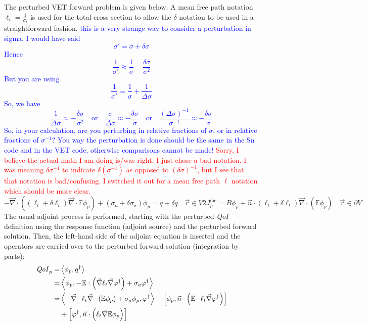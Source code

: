 \documentclass[12pt]{report}
\newcommand{\vr}{\vec{r}}
\newcommand{\bra}{\left\langle}
\newcommand{\ket}{\right\rangle}
\newcommand{\sbra}{\left[}
\newcommand{\sket}{\right]}
\renewcommand{\div}{\vec{\nabla} \cdot}
\newcommand{\grad}{\vec{\nabla}}
\newcommand{\vefadj}{\varphi^\dag}
\newcommand{\domain}{V}
\newcommand{\bound}{\partial V}
\newcommand{\vn}{\vec{n}}
\newcommand{\Edd}{\mathbb{E}}
\newcommand{\sigt}{\sigma_t}
\newcommand{\siga}{\sigma_a}
\newcommand{\isigt}{\ell_t}
\newcommand{\scalSource}{q}
\newcommand{\scalResp}{q^\dag}
\newcommand{\qoi}{{\it QoI}\xspace}
\newcommand{\comment}[2]{\marginpar{\textcolor{#2}{$\star$}}\textcolor{#2}{#1}\newline}
\newcommand{\iwh}[1]{\comment{#1}{red}}
\newcommand{\jcr}[1]{\comment{#1}{blue}}
\newcommand{\iwh}[1]{\phantom{a}}
\newcommand{\jcr}[1]{\phantom{a}}
\begin{document}
The perturbed VET forward problem is given below. A mean free path notation $\isigt=\frac{1}{\sigt}$ is used for the total
cross section to allow the $\delta$ notation to be used in a straightforward fashion.
\jcr{this is a very strange way to consider a perturbation in sigma. I would have said
\[ 
\sigma' =\sigma + \delta \sigma
\]
Hence
\[ 
\frac{1}{\sigma'} \approx \frac{1}{\sigma} - \frac{\delta\sigma}{\sigma^2}
\]
But you are using
\[
\frac{1}{\sigma'} = \frac{1}{\sigma} + \frac{1}{\Delta\sigma}
\]
So, we have
\[
\frac{1}{\Delta\sigma} \approx  - \frac{\delta\sigma}{\sigma^2} 
\quad \text{or} \quad
\frac{\sigma}{\Delta\sigma} \approx  - \frac{\delta\sigma}{\sigma} 
\quad \text{or} \quad
\frac{(\Delta\sigma)^{-1}}{\sigma^{-1}} \approx  - \frac{\delta\sigma}{\sigma} 
\]
So, in your calculation, are you perturbing in relative fractions of $\sigma$, or in relative fractions of $\sigma^{-1}$? You way the perturbation is done should be the same in the Sn code and in the VET code, otherwise comparisons cannot be made!
}
\iwh{Sorry, I believe the actual math I am doing is/was right, I just chose a bad notation. I was meaning $\delta \sigma^{-1}$ to indicate $\delta(\sigma^{-1})$ as opposed to $(\delta \sigma)^{-1}$, but I see that that notation is bad/confusing. I switched it out for a mean free path $\ell$ notation which should be more clear.}
\begin{subequations}
\begin{equation}
\label{VEFPert}
- \div \left((\isigt + \delta \isigt)\div \Edd \phi_p \right) + (\siga + \delta \siga)\phi_p = \scalSource + \delta \scalSource  \quad \vr \in \domain
\end{equation}
\begin{equation}
 2J_p^\text{inc} = B \phi_p  + \vn \cdot  (\isigt + \delta \isigt) \vec{\nabla} \cdot \left(\Edd \phi_p \right)  \quad \vr \in \bound
\end{equation}
\end{subequations}
The usual adjoint process is performed, starting with the perturbed \qoi definition using the response function (adjoint source) and the perturbed forward solution. Then, the left-hand side of the adjoint equation is inserted and the operators are carried over to the perturbed forward solution (integration by parts):
\begin{equation}
\label{VETSensDeriv}
\begin{split}
\qoi_p = &\bra \phi_p , \scalResp \ket \\
       = &\bra \phi_p , - \Edd : \left( \grad \isigt \grad \varphi^\dag \right) + \siga \vefadj \ket \\
       = & \bra - \div \isigt \div \left( \Edd \phi_p \right) + \siga \phi_p, \vefadj \ket 
 - \sbra \phi_p , \vn \cdot \left( \Edd \cdot \isigt \grad \vefadj\right) \sket  \\ 
&+ \sbra \vefadj , \vn \cdot  \left(  \isigt \grad \Edd \phi_p \right) \sket \\
\end{split}
\end{equation}
\end{document}
